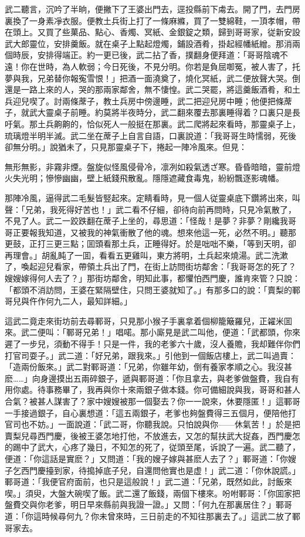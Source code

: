 武二聽言，沉吟了半晌，便撇下了王婆出門去，逕投縣前下䖏去。開了門，去門房裏換了一身素凈衣服。便教土兵街上打了一條麻縧，買了一雙綿鞋，一頂孝帽，帶在頭上。又買了些菓品、點心、香燭、冥紙、金銀錠之類，歸到哥哥家，従新安設武大郎靈位，安排羹飯。就在桌子上點起燈燭，鋪設酒肴，掛起經幡紙繒。那消兩個時辰，安排得端正。約一更已後，武二拈了香，撲翻身便拜道：「哥哥陰魂不遠！你在世時，為人軟弱；今日死後，不見分明。你若是負屈啣冤，被人害了，托夢與我，兄弟替你報寃雪恨！」把酒一面澆奠了，燒化冥紙，武二便放聲大哭。倒還是一路上來的人，哭的那兩家鄰舍，無不悽惶。武二哭罷，將這羹飯酒肴，和土兵迎兒喫了。討兩條蓆子，教土兵房中傍邊睡，武二把迎兒房中睡；他便把條蓆子，就武大靈桌子前睡。約莫將半夜時分，武二翻來覆去那裏睡得着？口裏只是長吁氣。那土兵齁齁的，恰似死人一般挺在那裏。武二爬將起來看時，那靈桌子上，琉璃燈半明半滅。武二坐在蓆子上自言自語，口裏說道：「我哥哥生時懦弱，死後卻無分明。」說猶未了，只見那靈桌子下，捲起一陣冷風來。但見：
\begin{myquote}
無形無影，非霧非煙。盤旋似怪風侵骨冷，凛冽如殺氣透ざ寒。昏昏暗暗，靈前燈火失光明；慘慘幽幽，壁上紙錢飛散亂。隱隱遮藏食毒鬼，紛紛飄逐影魂幡。
\end{myquote}

那陣冷風，逼得武二毛髮皆竪起來。定睛看時，見一個人従靈桌底下鑽將出來，叫聲：「兄弟，我死得好苦也！」武二看不仔細，卻待向前再問時，只見冷氣散了，不見了人。武二一跤跌翻在蓆子上坐的，尋思道：「怪哉！是夢？非夢？剛纔我哥哥正要報我知道，又被我的神氣衝散了他的魂。想來他這一死，必然不明。」聽那更鼓，正打三更三點；囬頭看那土兵，正睡得好。於是咄咄不樂，「等到天明，卻再理會。」胡亂盹了一囬，看看五更雞叫，東方將明，土兵起來燒湯。武二洗漱了，喚起迎兒看家，帶領土兵出了門，在街上訪問街坊鄰舍：「我哥哥怎的死了？嫂嫂嫁得何人去了？」那街坊鄰舍，明知此事，都懼怕西門慶，誰肯來管？只說：「都頭不消訪問，王婆在緊隔壁住，只問王婆就知了。」有那多口的說：「賣梨的鄆哥兒與仵作何九二人，最知詳細。」

這武二竟走來街坊前去尋鄆哥，只見那小猴子手裏拿着個柳籠簸羅兒，正糴米囬來。武二便叫：「鄆哥兄弟！」唱喏。那小廝見是武二叫他，便道：「武都頭，你來遲了一步兒，須動不得手！只是一件，我的老爹六十歲，沒人養贍，我却難伴你們打官司耍子。」武二道：「好兄弟，跟我來。」引他到一個飯店樓上，武二叫過賣：「造兩份飯來。」武二對鄆哥道：「兄弟，你雖年幼，倒有養家孝順之心。我沒甚麽……」向身邊摸出五兩碎銀子，遞與鄆哥道：「你且拿去，與老爹做盤費，我自有用你處。待事務畢了，我再與你十來兩銀子做本錢。你可備細說與我，哥哥和甚人合氣？被甚人謀害了？家中嫂嫂被那一個娶去？你一一說來，休要隱匿！」這鄆哥一手接過銀子，自心裏想道：「這五兩銀子，老爹也夠盤費得三五個月，便陪他打官司也不妨。」一面說道：「武二哥，你聽我說。只怕說與你——休氣苦！」於是把賣梨兒尋西門慶，後被王婆怎地打他，不放進去，又怎的幫扶武大捉姦，西門慶怎的踢中了武大，心疼了幾日，不知怎的死了，従頭至尾，诉說了一遍。武二聽了，便道：「你這話是實麽？」又問道：「我的嫂子嫁與甚麽人去了？」鄆哥道：「你嫂子乞西門慶擡到家，待搗掉底子兒，自還問他實也是虚！」武二道：「你休說謊。」鄆哥道：「我便官府面前，也只是這般說！」武二道：「兄弟，既然如此，討飯來喫。」須臾，大盤大碗喫了飯。武二還了飯錢，兩個下樓來。吩咐鄆哥：「你囬家把盤費交與你老爹，明日早來縣前與我證一證。」又問：「何九在那裏居住？」鄆哥道：「你這時候尋何九？你未曾來時，三日前走的不知往那裏去了。」這武二放了鄆哥家去。

